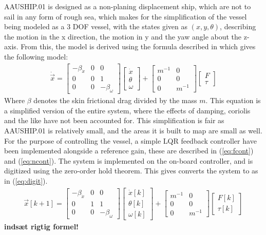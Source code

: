 \documentclass[journal]{IEEEtran}
\begin{document}
AAUSHIP.01 is designed as a non-planing displacement ship, which are not to sail in any form of rough sea, which makes for the simplification of the vessel being modeled as a 3 DOF vessel, with the states given as $(x,y,\theta)$, describing the motion in the x direction, the motion in y and the yaw angle about the z-axis. From this, the model is derived using the formula described in \cite{cyber} which gives the following model:
\begin{align}
\dot{\vec{x}} = \begin{bmatrix}
-\beta_{\dot{x}} & 0 & 0\\
0 & 0 & 1\\
0 & 0 & -\beta_{\omega} \end{bmatrix}\begin{bmatrix}
\dot{x}\\
\theta\\
\omega
\end{bmatrix} + \begin{bmatrix}
m^{-1} & 0\\
0 & 0\\
0 & m^{-1}
\end{bmatrix}\begin{bmatrix}
F\\
\tau
\end{bmatrix}
\label{eq:sscont}
\end{align}
Where $\beta$ denotes the skin frictional drag divided by the mass $m$. This equation is a simplified version of the entire system, where the effects of damping, coriolis and the like have not been accounted for. This simplification is fair as AAUSHIP.01 is relatively small, and the areas it is built to map are small as well. For the purpose of controlling the vessel, a simple LQR feedback controller have been implemented alongside a reference gain, these are described in (\ref{eq:fcont}) and (\ref{eq:ncont}). The system is implemented on the on-board controller, and is digitized using the zero-order hold theorem. This gives converts the system to as in (\ref{eq:digit}). 
\begin{align}
\vec{x}[k+1] = \begin{bmatrix}
-\beta_{\dot{x}} & 0 & 0\\
0 & 1 & 1\\
0 & 0 & -\beta_{\omega} \end{bmatrix}\begin{bmatrix}
\dot{x}[k]\\
\theta[k]\\
\omega[k]
\end{bmatrix} + \begin{bmatrix}
m^{-1} & 0\\
0 & 0\\
0 & m^{-1}
\end{bmatrix}\begin{bmatrix}
F[k]\\
\tau[k]
\end{bmatrix}
\label{eq:digit}
\end{align}
\textbf{indsæt rigtig formel!}
\end{document}
